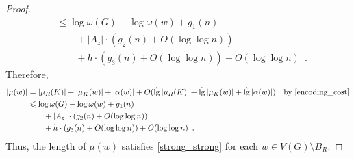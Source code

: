 \documentclass[twoside,leqno]{article}
\let\eqref\cref
\renewcommand{\le}{\leqslant}
\DeclareMathOperator{\lgg}{\hat{lg}}
\newcommand{\Oh}{O}
\begin{document}
\begin{proof}
\begin{align*}
     & \le \log \omega(G) - \log\omega(w) + g_1(n)                              \\
     & \qquad {} + |A_z|\cdot (g_2(n)+\Oh(\log\log n))                          \\
     & \qquad {} + h\cdot (g_3(n) + \Oh(\log\log n)) + \Oh(\log\log n)\enspace.
  \end{align*}
  Therefore,
  \begin{align*}
    |\mu(w)|
     & =|\mu_R(K)|+|\mu_K(w)|+|\alpha(w)|+ \Oh(\lgg|\mu_R(K)|+\lgg|\mu_K(w)|+\lgg|\alpha(w)|)
     & \text{by \eqref{encoding_cost}}                                                        \\
     & \le \log \omega(G) - \log\omega(w) + g_1(n)                                            \\
     & \qquad {} + |A_z|\cdot (g_2(n)+\Oh(\log\log n))                                        \\
     & \qquad {} + h\cdot (g_3(n) + \Oh(\log\log n)) + \Oh(\log\log n)\enspace.
  \end{align*}
  Thus, the length of $\mu(w)$ satisfies \eqref{strong_strong} for each $w\in V(G)\setminus B_R$.


\end{proof}
\end{document}
